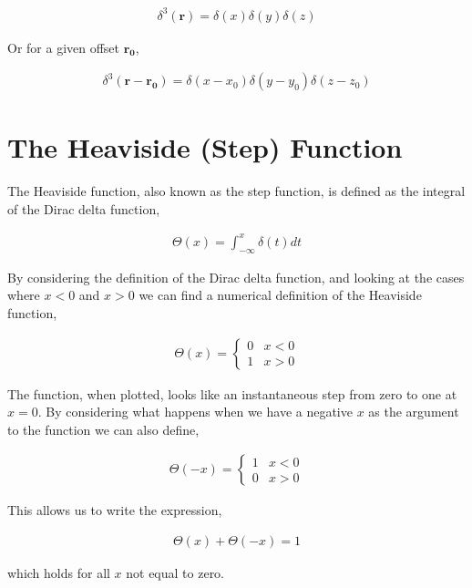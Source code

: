 \documentclass[11pt]{amsart}
\begin{document}
\begin{align*}
  \delta^3(\mathbf{r}) = \delta(x)\delta(y)\delta(z)
\end{align*}

Or for a given offset $\mathbf{r_0}$,

\begin{align*}
  \delta^3(\mathbf{r} - \mathbf{r_0}) = \delta(x - x_0)\delta(y - y_0)\delta(z - z_0)
\end{align*}

\section{The Heaviside (Step) Function}

The Heaviside function, also known as the step function, is defined as the integral of the Dirac delta function,

\begin{align}
  \label{eq:heavisideintegral}
  \Theta(x) = \int_{-\infty}^x\delta(t)dt
\end{align}

By considering the definition of the Dirac delta function, and looking at the cases where $x < 0$ and $x > 0$ we can find a numerical definition of the Heaviside function,

\begin{align*}
  \Theta(x) =
  \begin{cases}
    0 & x < 0 \\
    1 & x > 0
  \end{cases}
\end{align*}

The function, when plotted, looks like an instantaneous step from zero to one at $x = 0$. By considering what happens when we have a negative $x$ as the argument to the function we can also define,

\begin{align*}
  \Theta(-x) =
  \begin{cases}
    1 & x < 0 \\
    0 & x > 0
  \end{cases}
\end{align*}

This allows us to write the expression,

\begin{align*}
  \Theta(x) + \Theta(-x) = 1
\end{align*}

which holds for all $x$ not equal to zero.
\end{document}
